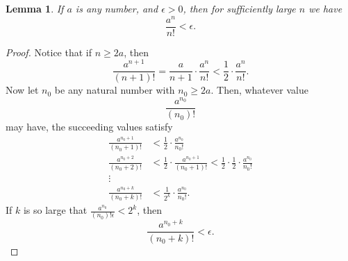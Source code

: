 \documentclass{article}
\newtheorem*{lemma*}{Lemma}
\begin{document}
\begin{lemma*}
  If $a$ is any number, and $\epsilon > 0$, then for sufficiently large $n$ we
  have \[
    \frac{a^n}{n!} < \epsilon.
  \]
\end{lemma*}
\begin{proof}
  Notice that if $n \geq 2a$, then \[
    \frac{a^{n+1}}{(n+1)!} = \frac{a}{n+1} \cdot \frac{a^n}{n!} <
    \frac{1}{2} \cdot \frac{a^n}{n!}.
  \] Now let $n_0$ be any natural number with $n_0 \geq 2a$. Then, whatever
  value \[
    \frac{a^{n_0}}{(n_0)!}
  \] may have, the succeeding values satisfy
  \begin{align*}
    \frac{a^{n_0 + 1}}{(n_0 + 1)!}
    &< \frac{1}{2} \cdot \frac{a^{n_0}}{n_0!} \\
    \frac{a^{n_0 + 2}}{(n_0 + 2)!}
    &< \frac{1}{2} \cdot \frac{a^{n_0 + 1}}{(n_0 + 1)!}
    < \frac{1}{2} \cdot \frac{1}{2} \cdot \frac{a^{n_0}}{n_0!} \\
    \vdots& \\
    \frac{a^{n_0 + k}}{(n_0 + k)!}
    &< \frac{1}{2^k} \cdot \frac{a^{n_0}}{n_0!}.
  \end{align*}
  If $k$ is so large that $\frac{a^{n_0}}{(n_0)!\epsilon} < 2^k$, then \[
    \frac{a^{n_0 + k}}{(n_0 + k)!} < \epsilon.
  \]
\end{proof}
\end{document}
